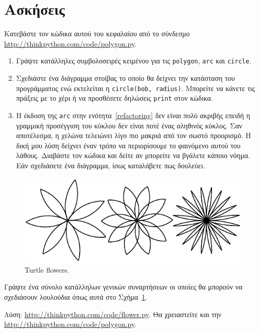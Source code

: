 \documentclass[10pt]{book}
\begin{document}
\section{Ασκήσεις}

\begin{exercise}

Κατεβάστε τον κώδικα αυτού του κεφαλαίου από το σύνδεσμο \url{http://thinkpython.com/code/polygon.py}.


\begin{enumerate}

\item Γράψτε κατάλληλες συμβολοσειρές κειμένου για τις {\tt polygon}, {\tt arc} και {\tt circle}. 

\item Σχεδιάστε ένα διάγραμμα στοίβας το οποίο θα δείχνει την κατάσταση του προγράμματος ενώ εκτελείται η  {\tt circle(bob, radius)}. 
Μπορείτε να κάνετε τις πράξεις με το χέρι ή να προσθέσετε δηλώσεις {\tt print} στον κώδικα.

\item Η έκδοση της  {\tt arc}  στην ενότητα~\ref{refactoring}  δεν είναι πολύ ακριβής επειδή
η γραμμική προσέγγιση του κύκλου δεν είναι ποτέ ένας αληθινός κύκλος. Σαν αποτέλεσμα, η χελώνα τελειώνει
λίγο πιο μακριά από τον σωστό προορισμό. Η δική μου λύση δείχνει έναν τρόπο να περιορίσουμε το φαινόμενο
αυτού του λάθους. Διαβάστε τον κώδικα και δείτε αν μπορείτε να βγάλετε κάποιο νόημα. Εάν σχεδιάσετε ένα
διάγραμμα, ίσως καταλάβετε πως δουλεύει.
\\
\end{enumerate}

\end{exercise}

\begin{figure}
\centerline
{\includegraphics[scale=0.8]{figs/flowers.pdf}}
\caption{Turtle flowers.}
\label{fig.flowers}
\end{figure}


\begin{exercise}

Γράψτε ένα σύνολο κατάλληλων γενικών συναρτήσεων οι οποίες θα μπορούν να σχεδιάσουν
λουλούδια όπως αυτά στο Σχήμα~\ref{fig.flowers}.

Λύση: \url{http://thinkpython.com/code/flower.py}. 
Θα χρειαστείτε και την \url{http://thinkpython.com/code/polygon.py}.
\\
\end{exercise}
\end{document}
